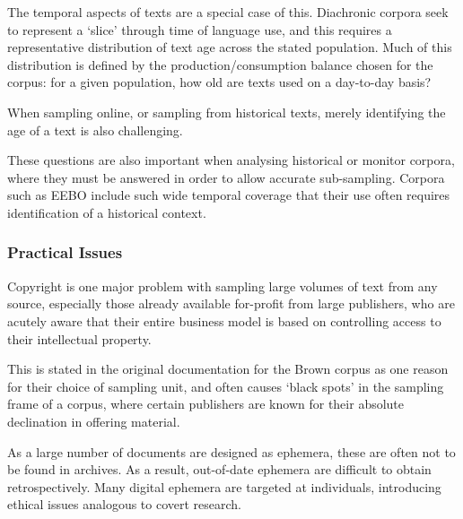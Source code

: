 The temporal aspects of texts are a special case of this.  Diachronic corpora seek to represent a `slice' through time of language use, and this requires a representative distribution of text age across the stated population.  Much of this distribution is defined by the production/consumption balance chosen for the corpus: for a given population, how old are texts used on a day-to-day basis?

When sampling online, or sampling from historical texts, merely identifying the age of a text is also challenging.

These questions are also important when analysing historical or monitor corpora, where they must be answered in order to allow accurate sub-sampling.  Corpora such as EEBO\cite{blum2002early} include such wide temporal coverage that their use often requires identification of a historical context.







\subsubsection{Practical Issues}
Copyright is one major problem with sampling large volumes of text from any source, especially those already available for-profit from large publishers, who are acutely aware that their entire business model is based on controlling access to their intellectual property.

This is stated in the original documentation for the Brown corpus as one reason for their choice of sampling unit, and often causes `black spots' in the sampling frame of a corpus, where certain publishers are known for their absolute declination in offering material.

%

As a large number of documents are designed as ephemera, these are often not to be found in archives.  As a result, out-of-date ephemera are difficult to obtain retrospectively.  Many digital ephemera are targeted at individuals, introducing ethical issues analogous to covert research.


